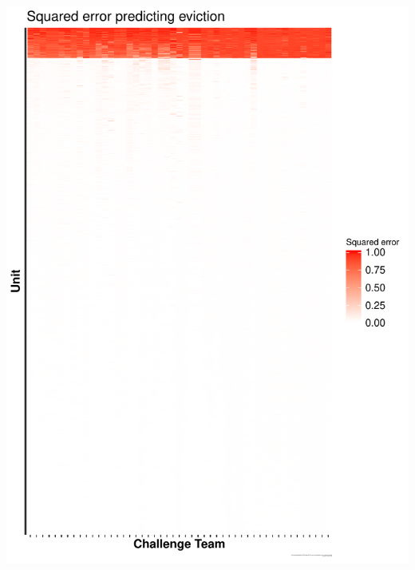 \documentclass{beamer}
\begin{document}
\begin{frame}
\begin{center}
\includegraphics[width=0.30\textheight]{figures/eviction_ysort_mse_unit_outcome_xsort_mse_account_outcome.pdf}

\end{center}
\end{frame}
\end{document}
